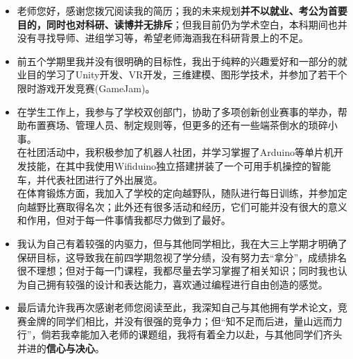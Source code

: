 \begin{itemize}[parsep=0.5ex]
  \item 老师您好，感谢您拨冗阅读我的简历；我的未来规划\textbf{并不以就业、考公为首要目的，同时也对科研、读博并无排斥}；但我目前仍为学术空白，本科期间也并没有寻找导师、进组学习等，希望老师海涵我在科研背景上的不足。\\

  \item 前五个学期里我并没有很明确的目标性，我出于纯粹的兴趣爱好和一部分的就业目的学习了Unity开发、VR开发，三维建模、图形学技术，并参加了若干个限时游戏开发竞赛(GameJam)。\\

  \item 在学生工作上，我参与了学校双创部门，协助了多项创新创业赛事的举办，帮助布置赛场、管理人员、制定规则等，但更多的还有一些端茶倒水的琐碎小事。
  \vspace{8pt}\\
 在社团活动中，我积极参加了机器人社团，并学习掌握了Arduino等单片机开发技能，在其中我使用Wifiduino独立搭建拼装了一个可用手机操控的智能车，并代表社团进行了外出展览。
  \vspace{8pt}\\
  在体育锻炼方面，我加入了学校的定向越野队，随队进行每日训练，并参加定向越野比赛取得名次；此外还有很多活动和经历，它们可能并没有很大的意义和作用，但对于每一件事情我都尽力做到了最好。\\

  \item 我认为自己有着较强的内驱力，但与其他同学相比，我在大三上学期才明确了保研目标，这导致我在前四学期忽视了学分绩，没有努力去“拿分”，成绩排名很不理想；但对于每一门课程，我都尽量去学习掌握了相关知识；同时我也认为自己拥有较强的设计和表达能力，喜欢通过编程进行自由创造的感觉。\\
  

  \item 最后请允许我再次感谢老师您阅读至此，我深知自己与其他拥有学术论文，竞赛金牌的同学们相比，并没有很强的竞争力；但“知不足而后进，量山远而力行”，倘若我幸能加入老师的课题组，我将有着全力以赴，与其他同学们齐头并进的\textbf{信心与决心}。
\end{itemize}
